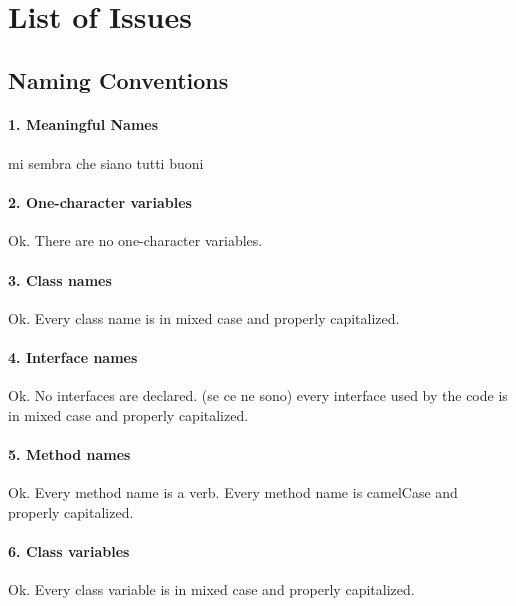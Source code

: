 \documentclass[english]{article}
\begin{document}
\section{List of Issues} %

\subsection{Naming Conventions}

\paragraph{1. Meaningful Names}
\paragraph{}
mi sembra che siano tutti buoni

\paragraph{2. One-character variables}

Ok.
There are no one-character variables.

\paragraph{3. Class names}
Ok.
Every class name is in mixed case and properly capitalized.

\paragraph{4. Interface names}
Ok.
No interfaces are declared.
(se ce ne sono) every interface used by the code is in mixed case and properly capitalized.

\paragraph{5. Method names}
Ok.
Every method name is a verb.
Every method name is camelCase and properly capitalized.

\paragraph{6. Class variables}
Ok.
Every class variable is in mixed case and properly capitalized.
\end{document}
